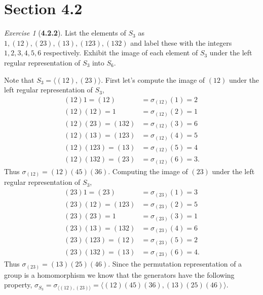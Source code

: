 \documentclass[12pt]{amsart}
\makeatletter
\theoremstyle{remark}
\newtheorem*{exercise}{Exercise}%
\renewenvironment{proof}[1][\proofname]{\par\doublespacing
  \pushQED{\qed}%
  \normalfont \topsep6\p@\@plus6\p@\relax
  \list{}{%
    \settowidth{\leftmargin}{\itshape\proofname:\hskip\labelsep}%
    \setlength{\labelwidth}{0pt}%
    \setlength{\itemindent}{-\leftmargin}%
  }%
  \item[\hskip\labelsep\itshape#1\@addpunct{:}]\ignorespaces
}{%
  \popQED\endlist\@endpefalse
  \singlespacing
}
\theoremstyle{mycomment}
\makeatother
\begin{document}
\vspace{.15in}



\section*{\textbf{Section 4.2}}


\begin{exercise}[\textbf{4.2.2}] List the elements of $S_3$ as $1, (12), (23), (13), (123), (132)$ and label 
  these with the integers $1, 2, 3, 4, 5, 6$ respectively. Exhibit the image of each element of $S_3$ under the left 
  regular representation of $S_3$ into $S_6$. 
  \begin{proof}[Solution] Note that $S_3 = \langle(12), (23)\rangle$. First let's compute the image of $(12)$ under the 
    left regular representation of $S_3$, 
    \begin{align*}
      (12)1 = (12) &= \sigma_{(12)}(1) = 2\\
      (12)(12) = 1 &= \sigma_{(12)}(2) = 1\\
      (12)(23) = (132) &= \sigma_{(12)}(3) = 6\\
      (12)(13) = (123) &= \sigma_{(12)}(4) = 5\\
      (12)(123) = (13) &= \sigma_{(12)}(5) = 4\\
      (12)(132) = (23) &= \sigma_{(12)}(6) = 3.
    \end{align*} 
    Thus $\sigma_{(12)} = (12)(45)(36)$. Computing the image of $(23)$ under the left regular representation of $S_3$, 
    \begin{align*}
      (23)1 = (23) &= \sigma_{(23)}(1) = 3\\
      (23)(12) = (123) &= \sigma_{(23)}(2) = 5\\
      (23)(23) = 1 &= \sigma_{(23)}(3) = 1\\
      (23)(13) = (132) &= \sigma_{(23)}(4) = 6\\
      (23)(123) = (12) &= \sigma_{(23)}(5) = 2\\
      (23)(132) = (13) &= \sigma_{(23)}(6) = 4.
    \end{align*} 
    Thus $\sigma_{(23)} = (13)(25)(46)$. 
    Since the permutation representation of a group is a homomorphism we know that the generators have the following property, 
    $\sigma_{S_3} = \sigma_{\langle(12), (23)\rangle} = \langle (12)(45)(36), (13)(25)(46)\rangle$. 
  \end{proof}
\end{exercise}
\vspace{.15in}
\end{document}
